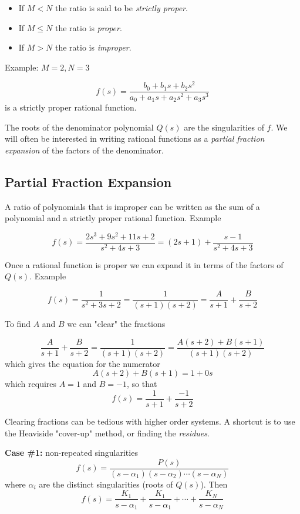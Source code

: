 \documentclass{article}
\begin{document}
\begin{itemize}
\item If $M < N$ the ratio is said to be \textit{strictly proper}.
\item If $M \leq N$ the ratio is \textit{proper}.
\item If $M > N$ the ratio is \textit{improper}.
\end{itemize}

Example: $M = 2, N=3$

\[
f(s) = \frac{b_0 + b_1 s + b_2 s^2}{a_0 + a_1 s + a_2 s^2 + a_3 s^3}
\]
is a strictly proper rational function.


The roots of the denominator polynomial $Q(s)$ are the singularities of $f$. We will often be interested in writing rational functions as a \textit{partial fraction expansion} of the factors of the denominator.

\subsection{Partial Fraction Expansion}

A ratio of polynomials that is improper can be written as the sum of a polynomial and a strictly proper rational function. Example

\[
f(s) = \frac{2s^3 + 9s^2 + 11s + 2}{s^2 + 4s + 3} = (2s+1) + \frac{s-1}{s^2 + 4s + 3}
\]

Once a rational function is proper we can expand it in terms of the factors of $Q(s)$. Example

\[
f(s) = \frac{1}{s^2 + 3s +2} = \frac{1}{(s+1)(s+2)} = \frac{A}{s+1} + \frac{B}{s+2}
\]

To find $A$ and $B$ we can "clear" the fractions

\[
\frac{A}{s+1} + \frac{B}{s+2} = \frac{1}{(s+1)(s+2)} = \frac{A(s+2) + B(s+1)}{(s+1)(s+2)}
\]
which gives the equation for the numerator
\[
A(s+2) + B(s+1) = 1 + 0s
\]
which requires $A = 1$ and $B = -1$, so that
\[
f(s) = \frac{1}{s+1} + \frac{-1}{s+2}
\]

Clearing fractions can be tedious with higher order systems. A shortcut is to use the Heaviside "cover-up" method, or finding the \textit{residues}.

\textbf{Case \#1:} non-repeated singularities
\[
f(s) = \frac{P(s)}{(s-\alpha_1)(s-\alpha_2)\cdots (s-\alpha_N)}
\]
where $\alpha_i$ are the distinct singularities (roots of $Q(s)$). Then
\[
f(s) = \frac{K_1}{s-\alpha_1} + \frac{K_1}{s-\alpha_1} + \cdots + \frac{K_N}{s-\alpha_N} 
\]
\end{document}
